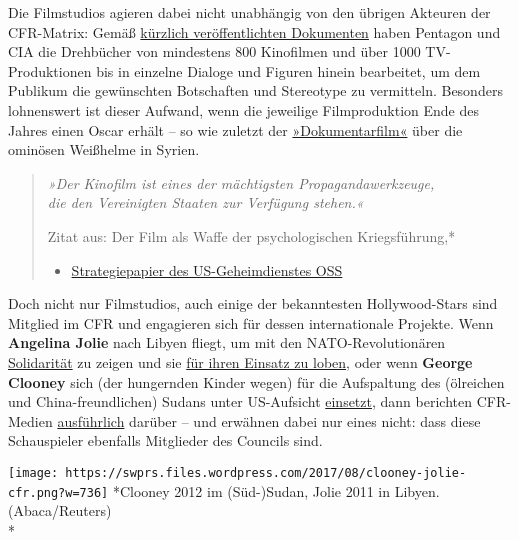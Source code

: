 Die Filmstudios agieren dabei nicht unabhängig von den übrigen Akteuren
der CFR-Matrix: Gemäß
\href{https://www.globalresearch.ca/documents-expose-how-hollywood-promotes-war-on-behalf-of-the-pentagon-cia-and-nsa/5597891}{kürzlich
veröffentlichten Dokumenten} haben Pentagon und CIA die Drehbücher von
mindestens 800 Kinofilmen und über 1000 TV-Produktionen bis in einzelne
Dialoge und Figuren hinein bearbeitet, um dem Publikum die gewünschten
Botschaften und Stereotype zu vermitteln. Besonders lohnenswert ist
dieser Aufwand, wenn die jeweilige Filmproduktion Ende des Jahres einen
Oscar erhält -- so wie zuletzt der
\href{http://edition.cnn.com/2017/02/26/us/white-helmets-oscar/}{»Dokumentarfilm«}
über die ominösen Weißhelme in Syrien.

\begin{quote}
\emph{»Der Kinofilm ist eines der mächtigsten Propagandawerkzeuge,}\\
\emph{die den Vereinigten Staaten zur Verfügung stehen.«}

Zitat aus: Der Film als Waffe der psychologischen Kriegsführung,*

\begin{itemize}
\tightlist
\item
  \href{https://web.archive.org/web/20170913122557/http://www.spyculture.com/docs/US/OSS-motionpicturesasweapons.pdf}{Strategiepapier
  des US-Geheimdienstes OSS}
\end{itemize}
\end{quote}

Doch nicht nur Filmstudios, auch einige der bekanntesten Hollywood-Stars
sind Mitglied im CFR und engagieren sich für dessen internationale
Projekte. Wenn \textbf{Angelina Jolie} nach Libyen fliegt, um mit den
NATO-Revolutionären
\href{https://www.reuters.com/article/us-libya-jolie-idUSTRE79A3S820111011}{Solidarität}
zu zeigen und sie
\href{https://www.reuters.com/article/us-libya-jolie-idUSTRE79A3S820111012}{für
ihren Einsatz zu loben}, oder wenn \textbf{George Clooney} sich (der
hungernden Kinder wegen) für die Aufspaltung des (ölreichen und
China-freundlichen) Sudans unter US-Aufsicht
\href{http://edition.cnn.com/2011/WORLD/africa/01/06/george.clooney.sudan.vote/index.html}{einsetzt},
dann berichten CFR-Medien
\href{http://www.thedailybeast.com/george-clooney-leverages-celebrity-to-bring-change-to-sudan}{ausführlich}
darüber -- und erwähnen dabei nur eines nicht: dass diese Schauspieler
ebenfalls Mitglieder des Councils sind.

\texttt{[image: https://swprs.files.wordpress.com/2017/08/clooney-jolie-cfr.png?w=736]}
*Clooney 2012 im (Süd-)Sudan, Jolie 2011 in Libyen. (Abaca/Reuters)\\
*

